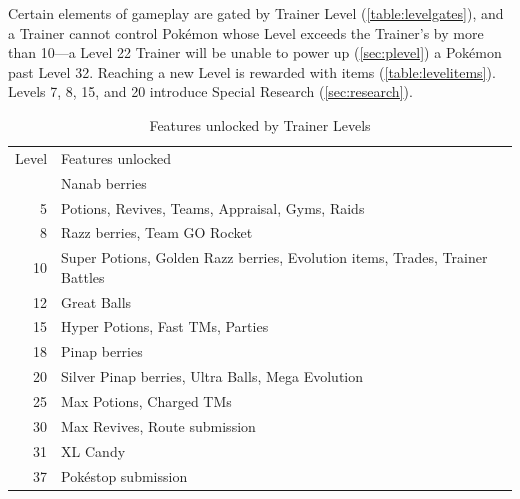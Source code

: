 Certain elements of gameplay are gated by Trainer Level (\autoref{table:levelgates}),
  and a Trainer cannot control Pokémon whose Level exceeds the Trainer's
  by more than 10---a Level 22 Trainer will be unable to power up (\autoref{sec:plevel}) a Pokémon past Level 32.
Reaching a new Level is rewarded with items (\autoref{table:levelitems}).
Levels 7, 8, 15, and 20 introduce Special Research (\autoref{sec:research}).
\begin{table}
  \centering
  \begin{tabular}{r p{}}
  Level & Features unlocked \\
\Midrule
  2 & Nanab berries \\
  5 & Potions, Revives, Teams, Appraisal, Gyms, Raids \\
  8 & Razz berries, Team GO Rocket \\
  10 & Super Potions, Golden Razz berries, Evolution items, Trades, Trainer Battles \\
  12 & Great Balls \\
  15 & Hyper Potions, Fast TMs, Parties \\
  18 & Pinap berries \\
  20 & Silver Pinap berries, Ultra Balls, Mega Evolution \\
  25 & Max Potions, Charged TMs \\
  30 & Max Revives, Route submission \\
  31 & XL Candy \\
  37 & Pokéstop submission \\
\end{tabular}
\caption{Features unlocked by Trainer Levels}
\label{table:levelgates}
\end{table}
